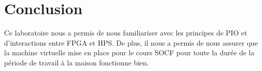 \section{Conclusion}

Ce laboratoire nous a permis de nous familiariser avec les principes de PIO et d'interactions entre FPGA et HPS. De plus, il nous a permis de nous assurer que la machine virtuelle mise en place pour le cours SOCF pour toute la durée de la période de travail à la maison fonctionne bien. 